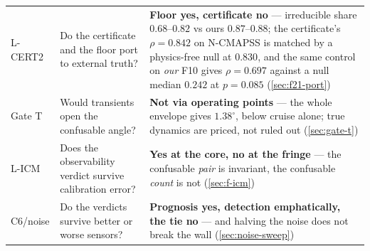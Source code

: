 \begin{table}[htbp]
\begin{tabular}{>{\raggedright\arraybackslash}p{}>{\raggedright\arraybackslash}p{}>{\raggedright\arraybackslash}p{}}
    L-CERT2 & Do the certificate and the floor port to external truth? & \textbf{Floor yes, certificate no} --- irreducible share $0.68$--$0.82$ vs ours $0.87$--$0.88$; the certificate's $\rho=0.842$ on N-CMAPSS is matched by a physics-free null at $0.830$, and the same control on \emph{our} F10 gives $\rho=0.697$ against a null median $0.242$ at $p=0.085$ (\cref{sec:f21-port}) \\
    Gate T & Would transients open the confusable angle? & \textbf{Not via operating points} --- the whole envelope gives $1.38^{\circ}$, below cruise alone; true dynamics are priced, not ruled out (\cref{sec:gate-t}) \\
    L-ICM & Does the observability verdict survive calibration error? & \textbf{Yes at the core, no at the fringe} --- the confusable \emph{pair} is invariant, the confusable \emph{count} is not (\cref{sec:f-icm}) \\
    C6/noise & Do the verdicts survive better or worse sensors? & \textbf{Prognosis yes, detection emphatically, the tie no} --- and halving the noise does not break the wall (\cref{sec:noise-sweep}) \\
    \bottomrule
  \end{tabular}
\end{table}
